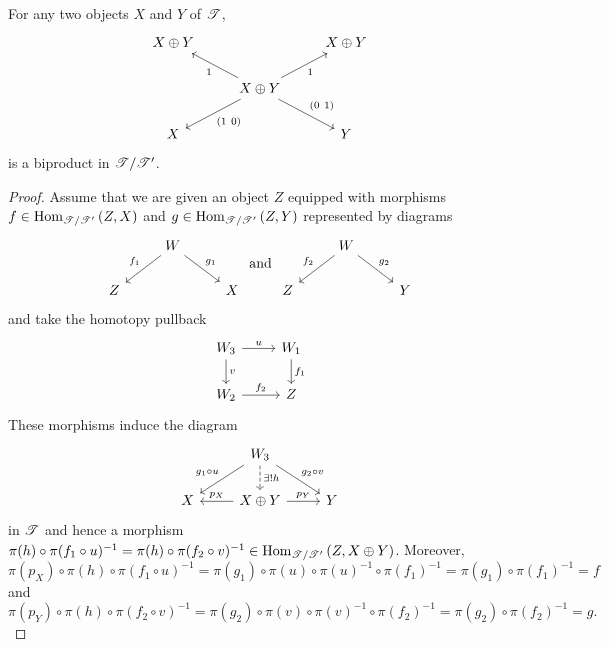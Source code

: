 \documentclass[dissertation.tex]{subfiles}
\begin{document}
\begin{lem}\label{verdierprods}
  For any two objects $X$ and $Y$ of $\mathscr{T}$,
  $$\begin{tikzcd}
    X \oplus Y & & X\oplus Y\\
    & X \oplus Y \arrow[swap]{ur}{1}\arrow{ul}{1}\arrow{ld}{\left(1\ 0\right)}\arrow{rd}{\left(0\ 1\right)}\\
    X & & Y
  \end{tikzcd}$$
  is a biproduct in $\mathscr{T}/\mathscr{T}^\prime$.
  
  \begin{proof}
    Assume that we are given an object $Z$ equipped with morphisms $f \in \operatorname{Hom}_{\mathscr{T}/\mathscr{T}^\prime}\left(Z,X\right)$ and $g \in \operatorname{Hom}_{\mathscr{T}/\mathscr{T}^\prime}\left(Z,Y\right)$ represented by diagrams
    $$\begin{tikzcd}
      & W \arrow[swap]{ld}{f_1}\arrow{rd}{g_1}\\
      Z & & X
    \end{tikzcd}
    \ \text{and}\ 
    \begin{tikzcd}
      & W \arrow[swap]{ld}{f_2}\arrow{rd}{g_2}\\
      Z & & Y
    \end{tikzcd}$$
    and take the homotopy pullback
    $$\begin{tikzcd}
      W_3 \arrow{r}{u}\arrow{d}{v} & W_1\arrow{d}{f_1}\\
      W_2 \arrow{r}{f_2} & Z
    \end{tikzcd}$$
    These morphisms induce the diagram
    $$\begin{tikzcd}
      & W_3\arrow[swap]{ld}{g_1 \circ u}\arrow{rd}{g_2 \circ v}\arrow[dashed]{d}{\exists !h}\\
      X & X \oplus Y \arrow[swap]{l}{p_X}\arrow{r}{p_Y} & Y
    \end{tikzcd}$$
    in $\mathscr{T}$ and hence a morphism $\pi(h) \circ \pi(f_1 \circ u)^{-1} = \pi(h) \circ \pi(f_2 \circ v)^{-1} \in \operatorname{Hom}_{\mathscr{T}/\mathscr{T}^\prime}\left(Z,X \oplus Y\right)$.
    Moreover, 
    $$\pi(p_X) \circ \pi(h) \circ \pi(f_1 \circ u)^{-1} = \pi(g_1) \circ \pi(u) \circ \pi(u)^{-1} \circ \pi(f_1)^{-1} = \pi(g_1) \circ \pi(f_1)^{-1} = f$$ 
    and
    $$\pi(p_Y) \circ \pi(h) \circ \pi(f_2 \circ v)^{-1} = \pi(g_2) \circ \pi(v) \circ \pi(v)^{-1} \circ \pi(f_2)^{-1} = \pi(g_2) \circ \pi(f_2)^{-1} = g.$$
    

\end{proof}
\end{lem}
\end{document}
